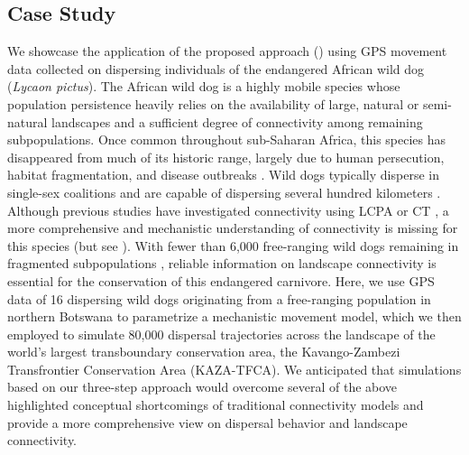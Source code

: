 \documentclass[abstract=on,10pt,a4paper,bibliography=totocnumbered]{article}
\begin{document}
\subsection{Case Study}
We showcase the application of the proposed approach ()
using GPS movement data collected on dispersing individuals of the endangered
African wild dog (\textit{Lycaon pictus}). The African wild dog is a highly
mobile species whose population persistence heavily relies on the availability
of large, natural or semi-natural landscapes and a sufficient degree of
connectivity among remaining subpopulations. Once common throughout sub-Saharan
Africa, this species has disappeared from much of its historic range, largely
due to human persecution, habitat fragmentation, and disease outbreaks
\citep{Woodroffe.2012}. Wild dogs typically disperse in single-sex coalitions
\citep{McNutt.1996, Behr.2020} and are capable of dispersing several hundred
kilometers \citep{DaviesMostert.2012, Masenga.2016, Cozzi.2020}. Although
previous studies have investigated connectivity using LCPA \citep{Hofmann.2021}
or CT \citep{Brennan.2020}, a more comprehensive and mechanistic understanding
of connectivity is missing for this species (but see \citealp{Creel.2020}). With
fewer than 6,000 free-ranging wild dogs remaining in fragmented subpopulations
\citep{Woodroffe.2012}, reliable information on landscape connectivity is
essential for the conservation of this endangered carnivore. Here, we use GPS
data of 16 dispersing wild dogs originating from a free-ranging population in
northern Botswana to parametrize a mechanistic movement model, which we then
employed to simulate 80,000 dispersal trajectories across the landscape of the
world's largest transboundary conservation area, the Kavango-Zambezi
Transfrontier Conservation Area (KAZA-TFCA). We anticipated that simulations
based on our three-step approach would overcome several of the above highlighted
conceptual shortcomings of traditional connectivity models and provide a more
comprehensive view on dispersal behavior and landscape connectivity.
\end{document}
